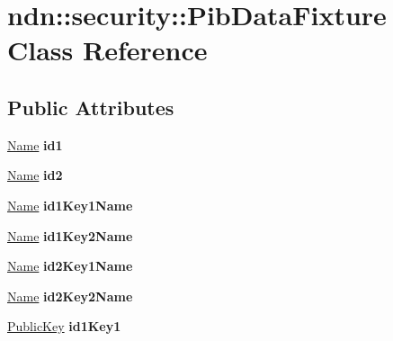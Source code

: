 \hypertarget{classndn_1_1security_1_1PibDataFixture}{}\section{ndn\+:\+:security\+:\+:Pib\+Data\+Fixture Class Reference}
\label{classndn_1_1security_1_1PibDataFixture}
\subsection*{Public Attributes}
\begin{DoxyCompactItemize}
\item 
\hyperlink{classndn_1_1Name}{Name} {\bfseries id1}\hypertarget{classndn_1_1security_1_1PibDataFixture_ad08b047ff6cd96cbbeedad3c2cb10253}{}\label{classndn_1_1security_1_1PibDataFixture_ad08b047ff6cd96cbbeedad3c2cb10253}

\item 
\hyperlink{classndn_1_1Name}{Name} {\bfseries id2}\hypertarget{classndn_1_1security_1_1PibDataFixture_a6cbdc565d81d43304ace0f0a0ca932c5}{}\label{classndn_1_1security_1_1PibDataFixture_a6cbdc565d81d43304ace0f0a0ca932c5}

\item 
\hyperlink{classndn_1_1Name}{Name} {\bfseries id1\+Key1\+Name}\hypertarget{classndn_1_1security_1_1PibDataFixture_a9593ce252a1acd4d24c5a2317f29d941}{}\label{classndn_1_1security_1_1PibDataFixture_a9593ce252a1acd4d24c5a2317f29d941}

\item 
\hyperlink{classndn_1_1Name}{Name} {\bfseries id1\+Key2\+Name}\hypertarget{classndn_1_1security_1_1PibDataFixture_ac1d3d8c1a51ed4593811b0d246028a3a}{}\label{classndn_1_1security_1_1PibDataFixture_ac1d3d8c1a51ed4593811b0d246028a3a}

\item 
\hyperlink{classndn_1_1Name}{Name} {\bfseries id2\+Key1\+Name}\hypertarget{classndn_1_1security_1_1PibDataFixture_ac1ea0927cac7b4b770fe0aa8add99286}{}\label{classndn_1_1security_1_1PibDataFixture_ac1ea0927cac7b4b770fe0aa8add99286}

\item 
\hyperlink{classndn_1_1Name}{Name} {\bfseries id2\+Key2\+Name}\hypertarget{classndn_1_1security_1_1PibDataFixture_ae812369cb7a10986a23d4671ce57c7f7}{}\label{classndn_1_1security_1_1PibDataFixture_ae812369cb7a10986a23d4671ce57c7f7}

\item 
\hyperlink{classndn_1_1PublicKey}{Public\+Key} {\bfseries id1\+Key1}\hypertarget{classndn_1_1security_1_1PibDataFixture_a51feaab9cd827aed0c6b44edf25d66bb}{}\label{classndn_1_1security_1_1PibDataFixture_a51feaab9cd827aed0c6b44edf25d66bb}


\end{DoxyCompactItemize}
